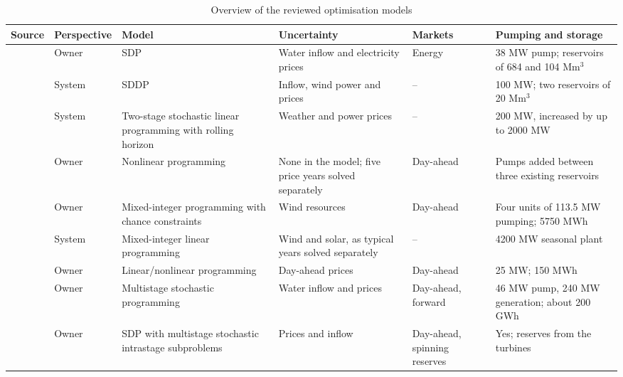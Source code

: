 \begin{table}[htbp]
\centering
\caption{Overview of the reviewed optimisation models}
\label{tab:literature_review}

\footnotesize
\renewcommand{\arraystretch}{1.3}
\setlength{\tabcolsep}{3pt}

\begin{tabularx}{\textwidth}{ @{} p{2.1cm} p{1.8cm} X X p{1.6cm} p{2.5cm} @{}}
\toprule

\textbf{Source} & \textbf{Perspective} & \textbf{Model} & \textbf{Uncertainty} & \textbf{Markets} & \textbf{Pumping and storage} \\

\midrule

\textcite{alic2023}
& Owner & SDP & Water inflow and electricity prices & Energy & 38 MW pump; reservoirs of 684 and 104 Mm$^3$ \\

\textcite{helseth2013}
& System & SDDP & Inflow, wind power and prices & -- & 100 MW; two reservoirs of 20 Mm$^3$ \\

\textcite{helseth2017}
& System & Two-stage stochastic linear programming with rolling horizon & Weather and power prices & -- & 200 MW, increased by up to 2000 MW \\

\textcite{ak2019}
& Owner & Nonlinear programming & None in the model; five price years solved separately & Day-ahead & Pumps added between three existing reservoirs \\

\textcite{naval2025}
& Owner & Mixed-integer programming with chance constraints & Wind resources & Day-ahead & Four units of 113.5 MW pumping; 5750 MWh \\

\textcite{zhang2026seasonal}
& System & Mixed-integer linear programming & Wind and solar, as typical years solved separately & -- & 4200 MW seasonal plant \\

\textcite{sauhats2016optimal}
& Owner & Linear/nonlinear programming & Day-ahead prices & Day-ahead & 25 MW; 150 MWh \\

\textcite{abgottspon2013}
& Owner & Multistage stochastic programming & Water inflow and prices & Day-ahead, forward & 46 MW pump, 240 MW generation; about 200 GWh \\

\textcite{abgottspon2014}
& Owner & SDP with multistage stochastic intrastage subproblems & Prices and inflow & Day-ahead, spinning reserves & Yes; reserves from the turbines \\


\end{tabularx}
\end{table}

